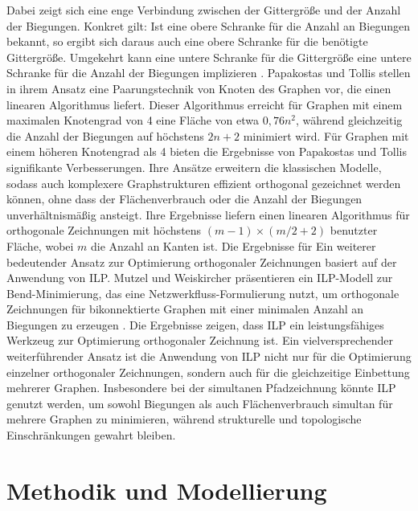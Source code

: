 \documentclass[bachelor, german]{algothesis}
\begin{document}
Dabei zeigt sich eine enge Verbindung zwischen der Gittergröße und der Anzahl der Biegungen. Konkret gilt: Ist eine obere Schranke für die Anzahl an Biegungen bekannt, so ergibt sich daraus auch eine obere Schranke für die benötigte Gittergröße. Umgekehrt kann eine untere Schranke für die Gittergröße eine untere Schranke für die Anzahl der Biegungen implizieren \cite{BendsSize}.\newline 
Papakostas und Tollis \cite{Pairing} stellen in ihrem Ansatz eine Paarungstechnik von Knoten des Graphen vor, die einen linearen Algorithmus liefert. Dieser Algorithmus erreicht für Graphen mit einem maximalen Knotengrad von 4 eine Fläche von etwa $0,76n^2$, während gleichzeitig die Anzahl der Biegungen  auf höchstens $2n+2$ minimiert wird. Für Graphen mit einem höheren Knotengrad als 4 bieten die Ergebnisse von Papakostas und Tollis \cite{Papakostas2000} signifikante Verbesserungen. Ihre Ansätze erweitern die klassischen Modelle, sodass auch komplexere Graphstrukturen effizient orthogonal gezeichnet werden können, ohne dass der Flächenverbrauch oder die Anzahl der Biegungen unverhältnismäßig ansteigt. Ihre Ergebnisse liefern einen linearen Algorithmus für orthogonale Zeichnungen mit höchstens $(m-1)\times (m/2 + 2)$ benutzter Fläche, wobei $m$ die Anzahl an Kanten ist.\newline
Die Ergebnisse für 
Ein weiterer bedeutender Ansatz zur Optimierung orthogonaler Zeichnungen basiert auf der Anwendung von ILP. Mutzel und Weiskircher präsentieren ein ILP-Modell zur Bend-Minimierung, das eine Netzwerkfluss-Formulierung nutzt, um orthogonale Zeichnungen für bikonnektierte Graphen mit einer minimalen Anzahl an Biegungen zu erzeugen \cite{ILPBEND}.\newline
Die Ergebnisse zeigen, dass ILP ein leistungsfähiges Werkzeug zur Optimierung orthogonaler Zeichnung ist. Ein vielversprechender weiterführender Ansatz ist die Anwendung von ILP nicht nur für die Optimierung einzelner orthogonaler Zeichnungen, sondern auch für die gleichzeitige Einbettung mehrerer Graphen. Insbesondere bei der simultanen Pfadzeichnung könnte ILP genutzt werden, um sowohl Biegungen als auch Flächenverbrauch simultan für mehrere Graphen zu minimieren, während strukturelle und topologische Einschränkungen gewahrt bleiben.


\chapter{Methodik und Modellierung}
\end{document}
